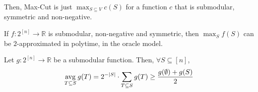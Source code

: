     Then, Max-Cut is just $\max_{S \subseteq V} c(S)$ for a function $c$ that is submodular, symmetric and non-negative.

    \begin{theorem}
        If $f : 2^{[n]} \rightarrow \mathbb{R}$ is submodular, non-negative and symmetric, then $\max_S f(S)$ can be $2$-approximated in polytime, in the oracle model.
    \end{theorem}

    \begin{lemma}\label{lemma:oracle_1}
       Let $g : 2^{[n]} \rightarrow \mathbb{R}$ be a submodular function.
       Then, $\forall S \subseteq [n]$,
       \[ \operatorname*{avg}_{T \subseteq S} g(T) = 2^{-\vert S \vert} \cdot \sum_{T \subseteq S} g(T) \geq \frac{g(\emptyset) + g(S)}{2}\] 
    \end{lemma}

